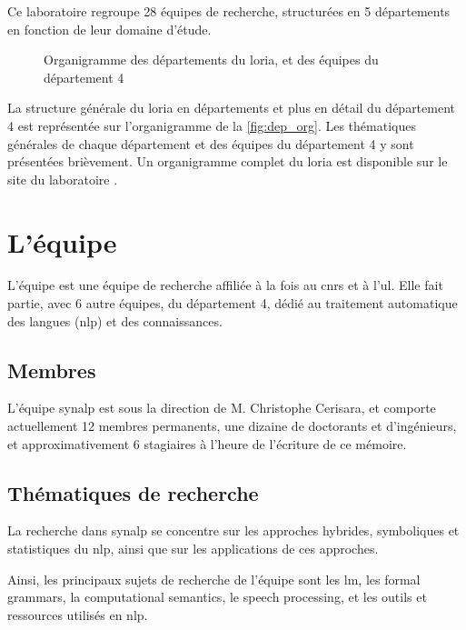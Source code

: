Ce laboratoire regroupe 28 équipes de recherche, structurées en 5 départements en fonction de leur domaine d'étude.

\begin{figure}[h]
	\centering
	\scalebox{1}{}
	\caption{Organigramme des départements du \gls{loria}, et des équipes du département 4}
	\label{fig:dep_org}
\end{figure}

La structure générale du \gls{loria} en départements et plus en détail du département 4 est représentée sur l'organigramme de la \autoref{fig:dep_org}. %
Les thématiques générales de chaque département et des équipes du département 4 y sont présentées brièvement.
Un organigramme complet du \gls{loria} est disponible sur {le site du laboratoire \autocite{org_loria}}.

\section{L'équipe }
L'équipe  est une équipe de recherche affiliée à la fois au \gls{cnrs} et à l'\gls{ul}.
Elle fait partie, avec 6 autre équipes, du département 4, dédié au traitement automatique des langues (\gls{nlp}) et des connaissances.

\subsection*{Membres}
L'équipe \gls{synalp} est sous la direction de M. Christophe Cerisara, et comporte actuellement 12 membres permanents, une dizaine de doctorants et d'ingénieurs, et approximativement 6 stagiaires à l'heure de l'écriture de ce mémoire.

\subsection*{Thématiques de recherche}
La recherche dans \gls{synalp} se concentre sur les approches hybrides, symboliques et statistiques du \gls{nlp}, ainsi que sur les applications de ces approches.

Ainsi, les principaux sujets de recherche de l'équipe sont les \gls{lm}, les \gls{formal grammars}, la \gls{computational semantics}, le \gls{speech processing}, et les outils et ressources utilisés en \gls{nlp}.

